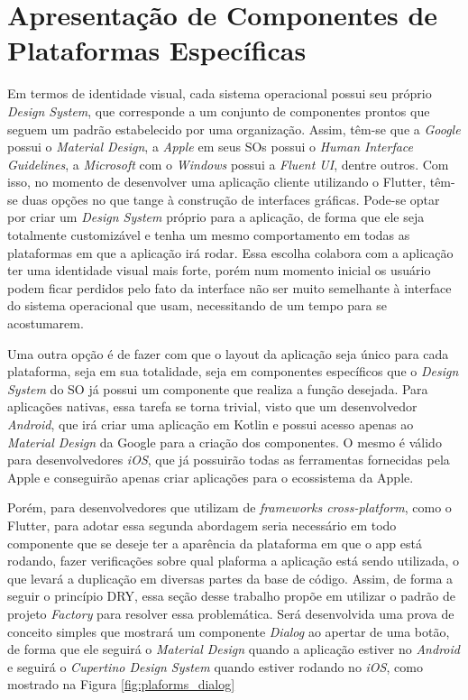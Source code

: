 \documentclass[12pt, %
openright, 
oneside, %
a4paper,    %
brazil]{facom-ufu-abntex2}
\begin{document}
\section{Apresentação de Componentes de Plataformas Específicas} \label{sec:plaform_components}

Em termos de identidade visual, cada sistema operacional possui seu próprio \textit{Design System}, que corresponde a um conjunto de componentes prontos que seguem um padrão estabelecido por uma organização. Assim, têm-se que a \textit{Google} possui o \textit{Material Design}, a \textit{Apple} em seus SOs possui o \textit{Human Interface Guidelines}, a \textit{Microsoft} com o \textit{Windows} possui a \textit{Fluent UI}, dentre outros. Com isso, no momento de desenvolver uma aplicação cliente utilizando o Flutter, têm-se duas opções no que tange à construção de interfaces gráficas. Pode-se optar por criar um \textit{Design System} próprio para a aplicação, de forma que ele seja totalmente customizável e tenha um mesmo comportamento em todas as plataformas em que a aplicação irá rodar. Essa escolha colabora com a aplicação ter uma identidade visual mais forte, porém num momento inicial os usuário podem ficar perdidos pelo fato da interface não ser muito semelhante à interface do sistema operacional que usam, necessitando de um tempo para se acostumarem.

Uma outra opção é de fazer com que o layout da aplicação seja único para cada plataforma, seja em sua totalidade, seja em componentes específicos que o \textit{Design System} do SO já possui um componente que realiza a função desejada. Para aplicações nativas, essa tarefa se torna trivial, visto que um desenvolvedor \textit{Android}, que irá criar uma aplicação em Kotlin e possui acesso apenas ao \textit{Material Design} da Google para a criação dos componentes. O mesmo é válido para desenvolvedores \textit{iOS}, que já possuirão todas as ferramentas fornecidas pela Apple e conseguirão apenas criar aplicações para o ecossistema da Apple.

Porém, para desenvolvedores que utilizam de \textit{frameworks cross-platform}, como o Flutter, para adotar essa segunda abordagem seria necessário em todo componente que se deseje ter a aparência da plataforma em que o app está rodando, fazer verificações sobre qual plaforma a aplicação está sendo utilizada, o que levará a duplicação em diversas partes da base de código. Assim, de forma a seguir o princípio DRY, essa  seção desse trabalho propõe em utilizar o padrão de projeto \textit{Factory} para resolver essa problemática. Será desenvolvida uma prova de conceito simples que mostrará um componente \textit{Dialog} ao apertar de uma botão, de forma que ele seguirá o \textit{Material Design} quando a aplicação estiver no \textit{Android} e seguirá o \textit{Cupertino Design System} quando estiver rodando no \textit{iOS}, como mostrado na Figura \ref{fig:plaforms_dialog}
\end{document}
